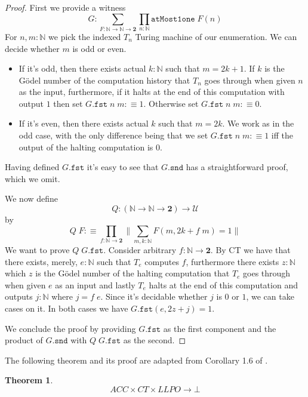 \documentclass[12pt]{report}
\newtheorem{thm}{Theorem}[chapter]
\theoremstyle{definition}
\begin{document}
\begin{proof}
First we provide a witness
$$G : \sum_{F : \mathbb{N} \rightarrow \mathbb{N} \rightarrow \mathbf{2} } \prod_{n : \mathbb{N}}\mathtt{atMost1one}\; F(n)$$
For $n, m : \mathbb{N}$ we pick the indexed $T_n$ Turing machine of our enumeration. 
We can decide whether $m$ is odd or even. 
\begin{itemize}
\item If it's odd, then there exists actual $k : \mathbb{N}$ such that $m = 2k +1$. 
If $k$ is the G\"odel number of the computation history that $T_n$ goes through when given $n$ as the input, furthermore, if it halts at the end of this computation with output $1$ then set $G.\mathtt{fst}\; n\; m :\equiv 1$. 
Otherwise set $G.\mathtt{fst}\; n\; m :\equiv 0$.
\item If it's even, then there exists actual $k$ such that $m = 2k$. 
We work as in the odd case, with the only difference being that we set $G.\mathtt{fst}\; n\; m :\equiv 1$ iff the output of the halting computation is $0$.
\end{itemize}
Having defined $G.\mathtt{fst}$ it's easy to see that $G.\mathtt{snd}$ has a straightforward proof, which we omit. 

We now define 
$$Q : (\mathbb{N} \rightarrow \mathbb{N} \rightarrow \mathbf{2}) \rightarrow \mathcal{U}$$ 
by 
$$Q\; F :\equiv \prod_{f : \mathbb{N} \rightarrow \mathbf{2}} \big\lVert \sum_{m, k : \mathbb{N}} F(m, 2k+ f\; m) = 1 \big\rVert$$
We want to prove $Q\; G.\mathtt{fst}$. 
Consider arbitrary $f : \mathbb{N} \rightarrow \mathbf{2}$. 
By CT we have that there exists, merely, $e : \mathbb{N}$ such that $T_e$ computes $f$, furthermore there exists $z : \mathbb{N}$ which $z$ is the G\"odel number of the halting computation that $T_e$ goes through when given $e$ as an input and lastly $T_e$ halts at the end of this computation and outputs $j : \mathbb{N}$ where $j = f\; e$. 
Since it's decidable whether $j$ is $0$ or $1$, we can take cases on it.
In both cases we have $G.\mathtt{fst} (e, 2z + j) = 1$. 

We conclude the proof by providing $G.\mathtt{fst}$ as the first component and the product of $G.\mathtt{snd}$ with $Q\; G.\mathtt{fst}$ as the second.
\end{proof}
The following theorem and its proof are adapted from Corollary 1.6 of \cite{bridges_richman_1987_1}. 
\begin{thm}
$$ACC \times CT \times LLPO \rightarrow \bot$$
\end{thm}
\end{document}
